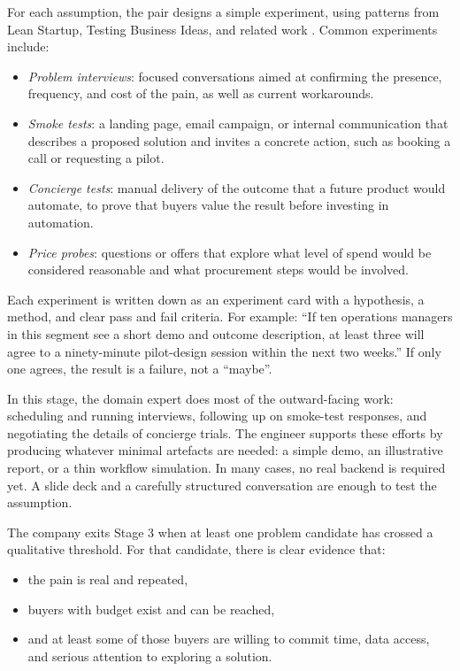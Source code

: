 \documentclass[10pt, a4paper, twocolumn]{article} %
\begin{document}
For each assumption, the pair designs a simple experiment, using patterns from Lean Startup, Testing Business Ideas, and related work \citep{ries2011lean,bland2019testing}. Common experiments include:

\begin{itemize}
  \item \emph{Problem interviews}: focused conversations aimed at confirming the presence, frequency, and cost of the pain, as well as current workarounds.
  \item \emph{Smoke tests}: a landing page, email campaign, or internal communication that describes a proposed solution and invites a concrete action, such as booking a call or requesting a pilot.
  \item \emph{Concierge tests}: manual delivery of the outcome that a future product would automate, to prove that buyers value the result before investing in automation.
  \item \emph{Price probes}: questions or offers that explore what level of spend would be considered reasonable and what procurement steps would be involved.
\end{itemize}

\newpage
Each experiment is written down as an experiment card with a hypothesis, a method, and clear pass and fail criteria. For example: “If ten operations managers in this segment see a short demo and outcome description, at least three will agree to a ninety-minute pilot-design session within the next two weeks.” If only one agrees, the result is a failure, not a ``maybe''.

In this stage, the domain expert does most of the outward-facing work: scheduling and running interviews, following up on smoke-test responses, and negotiating the details of concierge trials. The engineer supports these efforts by producing whatever minimal artefacts are needed: a simple demo, an illustrative report, or a thin workflow simulation. In many cases, no real backend is required yet. A slide deck and a carefully structured conversation are enough to test the assumption.

The company exits Stage 3 when at least one problem candidate has crossed a qualitative threshold. For that candidate, there is clear evidence that:

\begin{itemize}
  \item the pain is real and repeated,
  \item buyers with budget exist and can be reached,
  \item and at least some of those buyers are willing to commit time, data access, and serious attention to exploring a solution.
\end{itemize}
\end{document}
